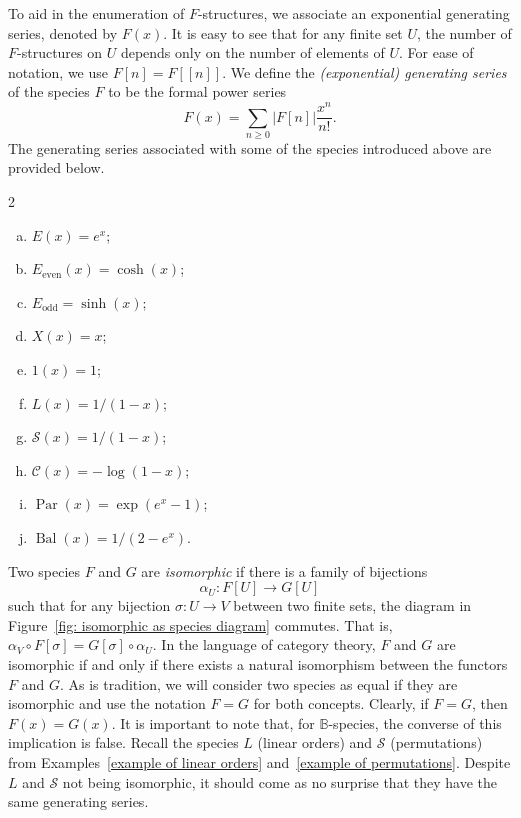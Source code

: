 \documentclass[a4paper, 11pt]{article}
\DeclareMathOperator{\Bal}{Bal}
\DeclareMathOperator{\Par}{Par}
\newcommand{\BB}{\mathbb{B}}
\newcommand{\Cyc}{\mathcal{C}}
\newcommand{\Sym}{\mathcal{S}}
\newcommand{\Even}[1]{#1_{\mathrm{even}}}
\newcommand{\Odd}[1]{#1_{\mathrm{odd}}}
\theoremstyle{definition}
\begin{document}
To aid in the enumeration of $F$-structures, we associate an exponential
generating series, denoted by $F(x)$. It is easy to see that for any finite set $U$, the
number of $F$-structures on $U$ depends only on the number of elements
of $U$. For ease of notation, we use $F[n] = F[[n]]$.
We define the \emph{(exponential) generating series} of the species $F$ to be the formal power series
\[
   F(x) = \sum_{n \geq 0} |F[n]| \frac{x^n}{n!}.
\]
The generating series associated with some of the species
introduced above are provided below.
\begin{multicols}{2}
\begin{enumerate}[(a)]
  \item\label{E egf} $E(x)= e^x$;
  \item $\Even{E}(x)= \cosh(x)$;
  \item $\Odd{E} = \sinh(x)$;
  \item $X(x) = x$;
  \item $1(x) = 1$;
  \item\label{L egf} $L(x)=1/(1-x)$;
  \item $\Sym(x) = 1/(1-x)$;
  \item $\Cyc(x) = -\log(1-x)$;
  \item $\Par(x) = \exp(e^x -1)$;
  \item $\Bal(x)=1/(2-e^x)$.
  \end{enumerate}
\end{multicols}

Two species $F$ and $G$ are \emph{isomorphic} if there
is a family of bijections
\[
  \alpha_U: F[U] \to G[U]
\]
such that for
any bijection $\sigma: U \to V$ between two finite sets, the diagram in
Figure~\ref{fig: isomorphic as species diagram} commutes. That is,
$\alpha_V \circ F[\sigma] = G[\sigma]\circ \alpha_U$. In the language of
category theory, $F$ and $G$ are isomorphic if and only if there exists a natural
isomorphism between the functors $F$ and $G$. As is tradition, we will
consider two species as equal if they are isomorphic and use the notation
$F=G$ for both concepts.
Clearly, if $F=G$, then $F(x)=G(x)$. It is important to note that, for $\BB$-species,
the converse of this implication is
false. Recall the species $L$ (linear orders) and $\Sym$ (permutations) from
Examples~\ref{example of linear orders} and~\ref{example of permutations}.
Despite $L$ and $\Sym$ not being isomorphic, it should come as no
surprise that they have the same generating series.
\end{document}
